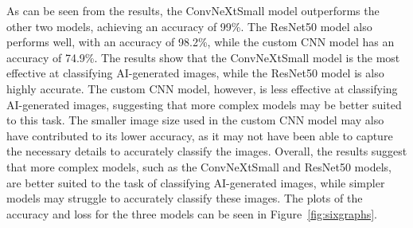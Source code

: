 \documentclass[runningheads]{llncs}
\begin{document}
As can be seen from the results, the ConvNeXtSmall model outperforms the other two models, achieving an accuracy of 99\%. The ResNet50 model also performs well, with an accuracy of 98.2\%, while the custom CNN model has an accuracy of 74.9\%. The results show that the ConvNeXtSmall model is the most effective at classifying AI-generated images, while the ResNet50 model is also highly accurate. The custom CNN model, however, is less effective at classifying AI-generated images, suggesting that more complex models may be better suited to this task. The smaller image size used in the custom CNN model may also have contributed to its lower accuracy, as it may not have been able to capture the necessary details to accurately classify the images. Overall, the results suggest that more complex models, such as the ConvNeXtSmall and ResNet50 models, are better suited to the task of classifying AI-generated images, while simpler models may struggle to accurately classify these images. The plots of the accuracy and loss for the three models can be seen in Figure~\ref{fig:sixgraphs}.
\end{document}
